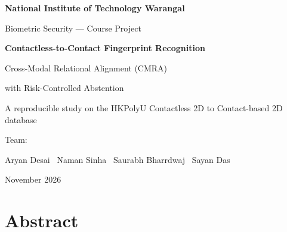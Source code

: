 \documentclass[12pt,a4paper]{article}
\begin{document}
\begin{titlepage}
\centering
\vspace*{2cm}
{\LARGE\textbf{National Institute of Technology Warangal}\par}
\vspace{0.5cm}
{\large Biometric Security --- Course Project\par}
\vspace{3cm}
{\Huge\textbf{Contactless-to-Contact Fingerprint Recognition}\par}
\vspace{1cm}
{\Large Cross-Modal Relational Alignment (CMRA)\par}
\vspace{0.5cm}
{\large with Risk-Controlled Abstention\par}
\vfill
\vspace{1cm}
{\large A reproducible study on the HKPolyU Contactless 2D to Contact-based 2D database\par}
\vspace{1cm}
{\large Team:\par}
Aryan Desai \textbullet\ Naman Sinha \textbullet\ Saurabh Bharrdwaj \textbullet\ Sayan Das\par
\vspace{1cm}
{\large November 2026\par}
\vfill
\end{titlepage}

\section*{Abstract}
\end{document}
